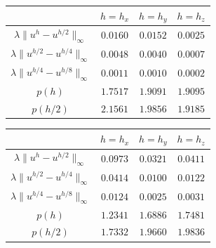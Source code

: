 \documentclass[12pt]{article}
\numberwithin{equation}{section}
\begin{document}
\begin{minipage}[t]{0.45\textwidth}
	\centering
	\begin{tabular}{c|c|c|c}
		\hline\hline
		\centering
		& $h = h_{x}$	& $h = h_{y}$& $h = h_{z}$ \\  \hline
		$\lambda\|u^{h} -  u^{h/2}\|_{\infty}$	&$0.0160$  & $0.0152$ & $0.0025$\\ \hline
		$\lambda\|u^{h/2} -  u^{h/4}\|_{\infty}$	&$0.0048$  & $0.0040$ & $0.0007$ \\ \hline
		$\lambda\|u^{h/4} -  u^{h/8}\|_{\infty}$	&$0.0011$  & $0.0010$ &  $0.0002$ \\ \hline\hline
		$p(h)$ & $1.7517$   & $1.9091$  & $1.9095$  \\ \hline
		$p(h/2)$ & $2.1561$   & $1.9856$  & $1.9185$  \\ \hline\hline
	\end{tabular}
	\label{Tab_01}
\end{minipage}
\hfill
\begin{minipage}[t]{0.45\textwidth}
	\centering
	\begin{tabular}{c|c|c|c}
		\hline\hline
		\centering
		& $h = h_{x}$	& $h = h_{y}$& $h = h_{z}$ \\  \hline
		$\lambda\|u^{h} -  u^{h/2}\|_{\infty}$	&$0.0973$  & $0.0321$ & $0.0411$\\ \hline
		$\lambda\|u^{h/2} -  u^{h/4}\|_{\infty}$	&$0.0414$  & $0.0100$ & $0.0122$ \\ \hline
		$\lambda\|u^{h/4} -  u^{h/8}\|_{\infty}$	&$0.0124$  & $0.0025$ &  $0.0031$ \\ \hline\hline
		$p(h)$ & $1.2341$   & $1.6886$  & $1.7481$  \\ \hline
		$p(h/2)$ & $1.7332$   & $1.9660$  & $1.9836$  \\ \hline\hline
	\end{tabular}
	\label{Tab_02}
\end{minipage}
\end{document}
